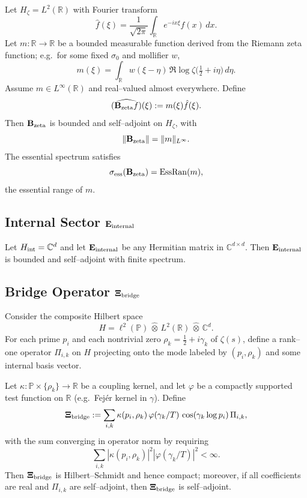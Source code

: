 \documentclass[11pt]{article}
\begin{document}
Let \(H_\zeta = L^2(\mathbb{R})\) with Fourier transform
\[
  \hat{f}(\xi) = \frac{1}{\sqrt{2\pi}}\int_{\mathbb{R}} e^{-ix\xi} f(x)\,dx.
\]
Let \(m:\mathbb{R} \to \mathbb{R}\) be a bounded measurable function derived from the Riemann zeta function; e.g.\ for some fixed \(\sigma_0\) and mollifier \(w\),
\[
  m(\xi) = \int_{\mathbb{R}} w(\xi-\eta)\, \Re\log\zeta\bigl(\tfrac12 + i\eta\bigr)\,d\eta.
\]
Assume \(m\in L^\infty(\mathbb{R})\) and real–valued almost everywhere. Define
\[
  (\widehat{\mathbf{B}_{\rm zeta} f})(\xi) := m(\xi) \hat{f}(\xi).
\]
Then \(\mathbf{B}_{\rm zeta}\) is bounded and self–adjoint on \(H_\zeta\), with
\[
  \|\mathbf{B}_{\rm zeta}\| = \|m\|_{L^\infty}.
\]
The essential spectrum satisfies
\[
  \sigma_{\rm ess}(\mathbf{B}_{\rm zeta})
  = \operatorname{EssRan}(m),
\]
the essential range of \(m\).

\subsection{Internal Sector \texorpdfstring{$\mathbf{E}_{\rm internal}$}{E\_internal}}

Let \(H_{\rm int} = \mathbb{C}^d\) and let \(\mathbf{E}_{\rm internal}\) be any Hermitian matrix in \(\mathbb{C}^{d\times d}\). Then \(\mathbf{E}_{\rm internal}\) is bounded and self–adjoint with finite spectrum.

\subsection{Bridge Operator \texorpdfstring{$\mathbf{\Xi}_{\rm bridge}$}{Xi\_bridge}}

Consider the composite Hilbert space
\[
  H = \ell^2(\mathbb{P}) \,\widehat{\otimes}\, L^2(\mathbb{R}) \,\widehat{\otimes}\, \mathbb{C}^d.
\]
For each prime \(p_i\) and each nontrivial zero \(\rho_k = \tfrac12 + i\gamma_k\) of \(\zeta(s)\), define a rank–one operator \(\Pi_{i,k}\) on \(H\) projecting onto the mode labeled by \((p_i,\rho_k)\) and some internal basis vector.

Let \(\kappa:\mathbb{P}\times\{\rho_k\} \to \mathbb{R}\) be a coupling kernel, and let \(\varphi\) be a compactly supported test function on \(\mathbb{R}\) (e.g.\ Fejér kernel in \(\gamma\)). Define
\[
  \mathbf{\Xi}_{\rm bridge}
  := \sum_{i,k} \kappa(p_i,\rho_k) \, \varphi(\gamma_k/T)\, \cos(\gamma_k\log p_i) \,\Pi_{i,k},
\]
with the sum converging in operator norm by requiring
\[
  \sum_{i,k} |\kappa(p_i,\rho_k)|^2 |\varphi(\gamma_k/T)|^2 < \infty.
\]
Then \(\mathbf{\Xi}_{\rm bridge}\) is Hilbert–Schmidt and hence compact; moreover, if all coefficients are real and \(\Pi_{i,k}\) are self–adjoint, then \(\mathbf{\Xi}_{\rm bridge}\) is self–adjoint.
\end{document}
